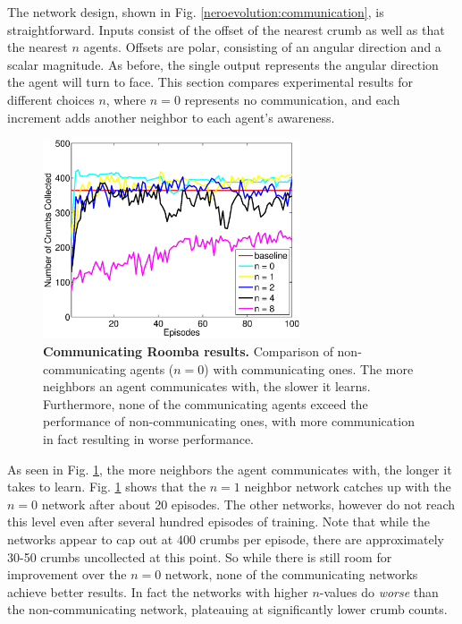 \documentclass[conference]{IEEEtran}
\begin{document}
The network design, shown in Fig. \ref{neroevolution:communication}, is straightforward. Inputs consist of the offset of the nearest crumb as well as that the nearest $n$ agents. Offsets are polar, consisting of an angular direction and a scalar magnitude. As before, the single output represents the angular direction the agent will turn to face. 
This section compares experimental results for different choices $n$, where $n=0$ represents no communication, and each increment adds another neighbor to each agent's awareness.

\begin{figure}[t]
\centering
\includegraphics[width=3.0in]{./figures/neroevolution/comm_result.eps}
\caption{\textbf{Communicating Roomba results.} Comparison of non-communicating agents ($n=0$) with communicating ones. The more neighbors an agent communicates with, the slower it learns. Furthermore, none of the communicating agents exceed the performance of non-communicating ones, with more communication in fact resulting in worse performance. }
\label{neroevolution:communication_results}
\end{figure}

As seen in Fig. \ref{neroevolution:communication_results}, the more neighbors the agent communicates with, the longer it takes to learn.  Fig. \ref{neroevolution:communication_results} shows that the $n=1$ neighbor network catches up with the $n=0$ network after about 20 episodes. The other networks, however do not reach this level even after several hundred episodes of training. Note that while the networks appear to cap out at 400 crumbs per episode, there are approximately 30-50 crumbs uncollected at this point. So while there is still room for improvement over the $n=0$ network, none of the communicating networks achieve better results. In fact the networks with higher $n$-values do \textit{worse} than the non-communicating network, plateauing at significantly lower crumb counts.
\end{document}
